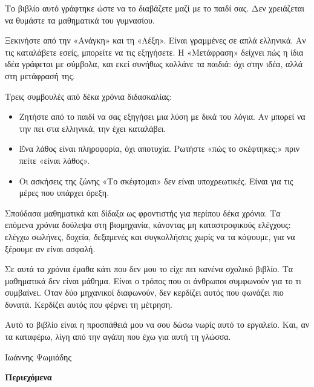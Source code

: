 
Το βιβλίο αυτό γράφτηκε ώστε να το διαβάζετε μαζί με το παιδί σας. Δεν χρειάζεται να θυμάστε τα μαθηματικά του γυμνασίου.

Ξεκινήστε από την «Ανάγκη» και τη «Λέξη». Είναι γραμμένες σε απλά ελληνικά. Αν τις καταλάβετε εσείς, μπορείτε να τις εξηγήσετε. Η «Μετάφραση» δείχνει πώς η ίδια ιδέα γράφεται με σύμβολα, και εκεί συνήθως κολλάνε τα παιδιά: όχι στην ιδέα, αλλά στη μετάφρασή της.

Τρεις συμβουλές από δέκα χρόνια διδασκαλίας:

\begin{itemize}[leftmargin=1.4em,itemsep=0.4ex]
\item Ζητήστε από το παιδί να σας εξηγήσει μια λύση με δικά του λόγια. Αν μπορεί να την πει στα ελληνικά, την έχει καταλάβει.
\item Ένα λάθος είναι πληροφορία, όχι αποτυχία. Ρωτήστε «πώς το σκέφτηκες;» πριν πείτε «είναι λάθος».
\item Οι ασκήσεις της ζώνης «Το σκέφτομαι» δεν είναι υποχρεωτικές. Είναι για τις μέρες που υπάρχει όρεξη.
\end{itemize}


Σπούδασα μαθηματικά και δίδαξα ως φροντιστής για περίπου δέκα χρόνια. Τα επόμενα χρόνια δούλεψα στη βιομηχανία, κάνοντας μη καταστροφικούς ελέγχους: ελέγχω σωλήνες, δοχεία, δεξαμενές και συγκολλήσεις χωρίς να τα κόψουμε, για να ξέρουμε αν είναι ασφαλή.

Σε αυτά τα χρόνια έμαθα κάτι που δεν μου το είχε πει κανένα σχολικό βιβλίο. Τα μαθηματικά δεν είναι μάθημα. Είναι ο τρόπος που οι άνθρωποι συμφωνούν για το τι συμβαίνει. Όταν δύο μηχανικοί διαφωνούν, δεν κερδίζει αυτός που φωνάζει πιο δυνατά. Κερδίζει αυτός που φέρνει τη μέτρηση.

Αυτό το βιβλίο είναι η προσπάθειά μου να σου δώσω νωρίς αυτό το εργαλείο. Και, αν τα καταφέρω, λίγη από την αγάπη που έχω για αυτή τη γλώσσα.

\hfill Ιωάννης Ψωμιάδης

\cleardoublepage
{}
{\color{gblue}\bfseries\Large Περιεχόμενα}\par\vspace{3mm}
\makeatletter
{}
\makeatother
